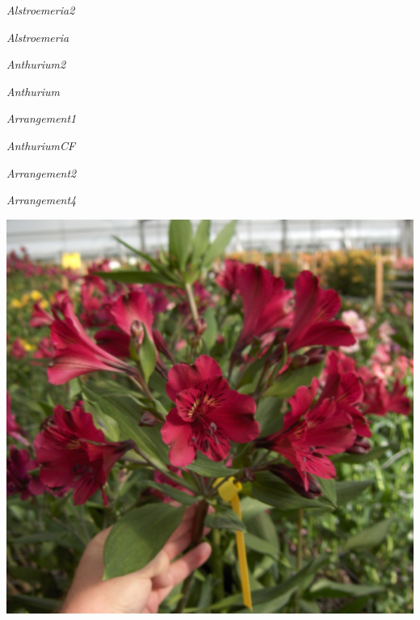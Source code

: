\documentclass{article}
\begin{document}
\noindent   
\vfill
\centerline{{\Large\emph{Alstroemeria2}}}
\vfill
\newpage

\noindent   
\vfill
\centerline{{\Large\emph{Alstroemeria}}}
\vfill
\newpage

\noindent   
\vfill
\centerline{{\Large\emph{Anthurium2}}}
\vfill
\newpage

\noindent   
\vfill
\centerline{{\Large\emph{Anthurium}}}
\vfill
\newpage

\noindent   
\vfill
\centerline{{\Large\emph{Arrangement1}}}
\vfill
\newpage

\noindent   
\vfill
\centerline{{\Large\emph{AnthuriumCF}}}
\vfill
\newpage

\noindent   
\vfill
\centerline{{\Large\emph{Arrangement2}}}
\vfill
\newpage

\noindent   
\vfill
\centerline{{\Large\emph{Arrangement4}}}
\vfill
\newpage

\begin{center}
\includegraphics[width=0.9\textheight, angle=90]{../Alstroemeria.jpg}
\end{center}
\newpage
\end{document}
